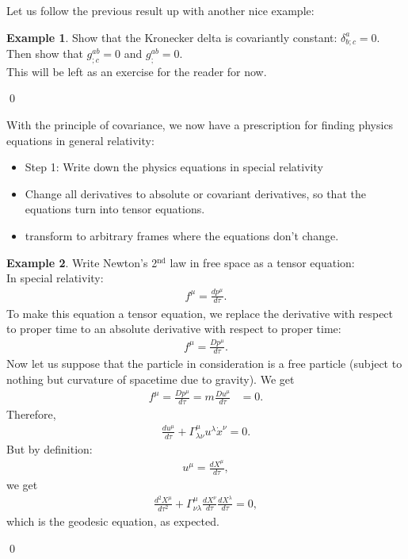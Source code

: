 \documentclass{book}
\theoremstyle{definition}
\newtheorem{exmp}{Example}[section]
\begin{document}
Let us follow the previous result up with another nice example:
\begin{exmp}
	Show that the Kronecker delta is covariantly constant: $\delta^a_{b;c} = 0$. Then show that $g^{ab}_{;c} = 0$ and $g^{ab}_{;} = 0$.\\
	
	This will be left as an exercise for the reader for now. 
\end{exmp}\qed

With the principle of covariance, we now have a prescription for finding physics equations in general relativity: 
\begin{itemize}
	\item Step 1: Write down the physics equations in special relativity
	\item Change all derivatives to absolute or covariant derivatives, so that the equations turn into tensor equations.
	\item transform to arbitrary frames where the equations don't change.
\end{itemize}

\begin{exmp}
	Write Newton's 2$^{\text{nd}}$ law in free space as a tensor equation:\\
	
	In special relativity: 
	\begin{align*}
	f^\mu = \frac{dp^\mu}{d\tau}.
	\end{align*}
	To make this equation a tensor equation, we replace the derivative with respect to proper time to an absolute derivative with respect to proper time:
	\begin{align*}
	f^\mu = \frac{Dp^\mu}{d\tau}.
	\end{align*}
	Now let us suppose that the particle in consideration is a free particle (subject to nothing but curvature of spacetime due to gravity). We get
	\begin{align*}
	f^\mu = \frac{Dp^\mu}{d\tau} = m\frac{Du^\mu}{d\tau} &= 0.
	\end{align*}
	Therefore,
	\begin{align*}
	\frac{du^\mu}{d\tau} + \Gamma^\mu_{\lambda\nu}u^\lambda\dot{x}^\nu = 0.
	\end{align*}
	But by definition:
	\begin{align*}
	u^\mu = \frac{dX^\mu}{d\tau},
	\end{align*}
	we get
	\begin{align*}
	\frac{d^2X^\mu}{d\tau^2} + \Gamma^\mu_{\nu\lambda}\frac{dX^\nu}{d\tau}\frac{dX^\lambda}{d\tau} = 0,
	\end{align*}
	which is the geodesic equation, as expected. 
\end{exmp}\qed
\end{document}
